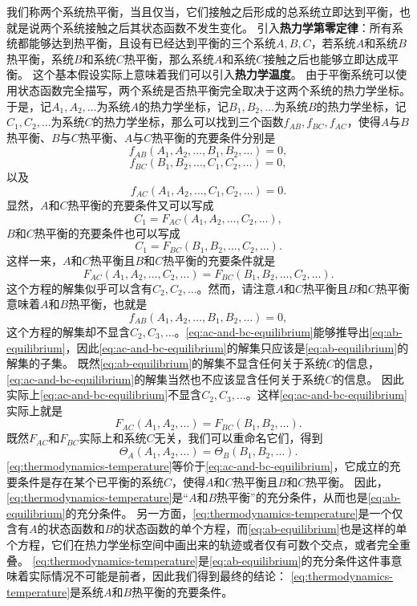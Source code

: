 \documentclass[hyperref, UTF8, a4paper]{ctexart}
\begin{document}
我们称两个系统热平衡，当且仅当，它们接触之后形成的总系统立即达到平衡，也就是说两个系统接触之后其状态函数不发生变化。
引入\textbf{热力学第零定律}：所有系统都能够达到热平衡，且设有已经达到平衡的三个系统$A,B,C$，若系统$A$和系统$B$热平衡，系统$B$和系统$C$热平衡，那么系统$A$和系统$C$接触之后也能够立即达成平衡。
这个基本假设实际上意味着我们可以引入\textbf{热力学温度}。
由于平衡系统可以使用状态函数完全描写，两个系统是否热平衡完全取决于这两个系统的热力学坐标。
于是，记$A_1, A_2, \ldots$为系统$A$的热力学坐标，记$B_1, B_2, \ldots$为系统$B$的热力学坐标，记$C_1, C_2, \ldots$为系统$C$的热力学坐标，那么可以找到三个函数$f_{AB}, f_{BC}, f_{AC}$，使得$A$与$B$热平衡、$B$与$C$热平衡、$A$与$C$热平衡的充要条件分别是
\[
    f_{AB} (A_1, A_2, \ldots, B_1, B_2, \ldots) = 0,
\]
\[
    f_{BC} (B_1, B_2, \ldots, C_1, C_2, \ldots) = 0,
\]
以及
\[
    f_{AC} (A_1, A_2, \ldots, C_1, C_2, \ldots) = 0. 
\]
显然，$A$和$C$热平衡的充要条件又可以写成
\[
    C_1 = F_{AC} (A_1, A_2, \ldots, C_2, \ldots),
\]
$B$和$C$热平衡的充要条件也可以写成
\[
    C_1 = F_{BC} (B_1, B_2, \ldots, C_2, \ldots).
\]
这样一来，$A$和$C$热平衡且$B$和$C$热平衡的充要条件就是
\begin{equation}
    F_{AC} (A_1, A_2, \ldots, C_2, \ldots) = F_{BC} (B_1, B_2, \ldots, C_2, \ldots).
    \label{eq:ac-and-bc-equilibrium}
\end{equation}
这个方程的解集似乎可以含有$C_2, C_2, \ldots$。然而，请注意$A$和$C$热平衡且$B$和$C$热平衡意味着$A$和$B$热平衡，也就是
\begin{equation}
    f_{AB} (A_1, A_2, \ldots, B_1, B_2, \ldots) = 0,
    \label{eq:ab-equilibrium}
\end{equation}
这个方程的解集却不显含$C_2, C_3, \ldots$。\eqref{eq:ac-and-bc-equilibrium}能够推导出\eqref{eq:ab-equilibrium}，因此\eqref{eq:ac-and-bc-equilibrium}的解集只应该是\eqref{eq:ab-equilibrium}的解集的子集。
既然\eqref{eq:ab-equilibrium}的解集不显含任何关于系统$C$的信息，\eqref{eq:ac-and-bc-equilibrium}的解集当然也不应该显含任何关于系统$C$的信息。
因此实际上\eqref{eq:ac-and-bc-equilibrium}不显含$C_2, C_3, \ldots$。这样\eqref{eq:ac-and-bc-equilibrium}实际上就是
\[
    F_{AC} (A_1, A_2, \ldots) = F_{BC} (B_1, B_2, \ldots).
\]
既然$F_{AC}$和$F_{BC}$实际上和系统$C$无关，我们可以重命名它们，得到
\begin{equation}
    \Theta_A (A_1, A_2, \ldots) = \Theta_B (B_1, B_2, \ldots).
    \label{eq:thermodynamics-temperature}
\end{equation}
\eqref{eq:thermodynamics-temperature}等价于\eqref{eq:ac-and-bc-equilibrium}，它成立的充要条件是存在某个已平衡的系统$C$，使得$A$和$C$热平衡且$B$和$C$热平衡。
因此，\eqref{eq:thermodynamics-temperature}是“$A$和$B$热平衡”的充分条件，从而也是\eqref{eq:ab-equilibrium}的充分条件。
另一方面，\eqref{eq:thermodynamics-temperature}是一个仅含有$A$的状态函数和$B$的状态函数的单个方程，而\eqref{eq:ab-equilibrium}也是这样的单个方程，它们在热力学坐标空间中画出来的轨迹或者仅有可数个交点，或者完全重叠。
\eqref{eq:thermodynamics-temperature}是\eqref{eq:ab-equilibrium}的充分条件这件事意味着实际情况不可能是前者，因此我们得到最终的结论：
\eqref{eq:thermodynamics-temperature}是系统$A$和$B$热平衡的充要条件。
\end{document}
